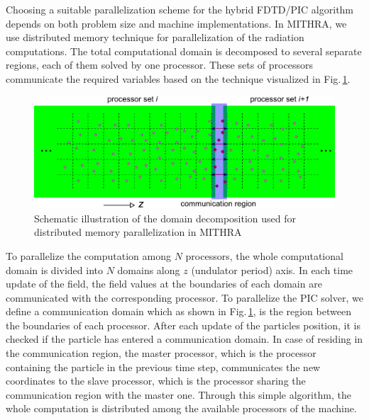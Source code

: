 Choosing a suitable parallelization scheme for the hybrid FDTD/PIC algorithm depends on both problem size and machine implementations.
%
In MITHRA, we use distributed memory technique for parallelization of the radiation computations.
%
The total computational domain is decomposed to several separate regions, each of them solved by one processor.
%
These sets of processors communicate the required variables based on the technique visualized in Fig.\,\ref{FDTDPICFig5}.
%
\begin{figure}
\centering
\includegraphics[width=5.0in]{./MITHRA_FDTDPIC/Fig5/Fig5.pdf}
\caption{Schematic illustration of the domain decomposition used for distributed memory parallelization in MITHRA}
\label{FDTDPICFig5}
\end{figure}

To parallelize the computation among $N$ processors, the whole computational domain is divided into $N$ domains along $z$ (undulator period) axis.
%
In each time update of the field, the field values at the boundaries of each domain are communicated with the corresponding processor.
%
To parallelize the PIC solver, we define a communication domain which as shown in Fig.\,\ref{FDTDPICFig5}, is the region between the boundaries of each processor.
%
After each update of the particles position, it is checked if the particle has entered a communication domain.
%
In case of residing in the communication region, the master processor, which is the processor containing the particle in the previous time step, communicates the new coordinates to the slave processor, which is the processor sharing the communication region with the master one.
%
Through this simple algorithm, the whole computation is distributed among the available processors of the machine. 
